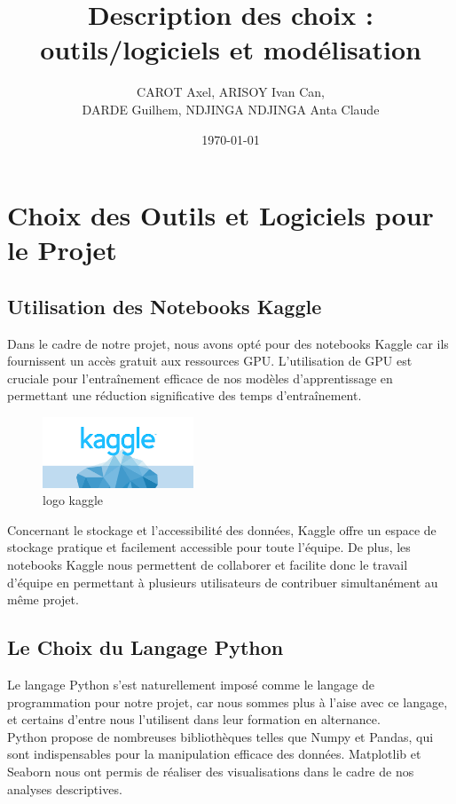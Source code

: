 \documentclass{article}
\title{Description des choix : outils/logiciels et modélisation}
\author{CAROT Axel, ARISOY Ivan Can, \\ DARDE Guilhem, NDJINGA NDJINGA Anta Claude}
\date{\today}
\begin{document}
\maketitle

\section{Choix des Outils et Logiciels pour le Projet}
\subsection{Utilisation des Notebooks Kaggle}
Dans le cadre de notre projet, nous avons opté pour des notebooks Kaggle car ils fournissent un accès gratuit aux ressources GPU. L'utilisation de GPU est cruciale pour l'entraînement efficace de nos modèles d'apprentissage en permettant une réduction significative des temps d'entraînement.

\begin{figure}[h]
    \centering
    \includegraphics[width=0.4\textwidth]{kaggle.png}
    \caption{logo kaggle}
    \label{fig:kaggle}
\end{figure}

Concernant le stockage et l'accessibilité des données, Kaggle offre un espace de stockage pratique et facilement accessible pour toute l'équipe. De plus, les notebooks Kaggle  nous permettent de collaborer et facilite donc le travail d'équipe en permettant à plusieurs utilisateurs de contribuer simultanément au même projet. 

\subsection{Le Choix du Langage Python}

Le langage Python s'est naturellement imposé comme le langage de programmation pour notre projet, car nous sommes plus à l'aise avec ce langage, et certains d'entre nous l'utilisent dans leur formation en alternance. \\

Python propose de nombreuses bibliothèques telles que Numpy et Pandas, qui sont indispensables pour la manipulation efficace des données. Matplotlib et Seaborn nous ont permis de réaliser des visualisations dans le cadre de nos analyses descriptives. \\
\end{document}
